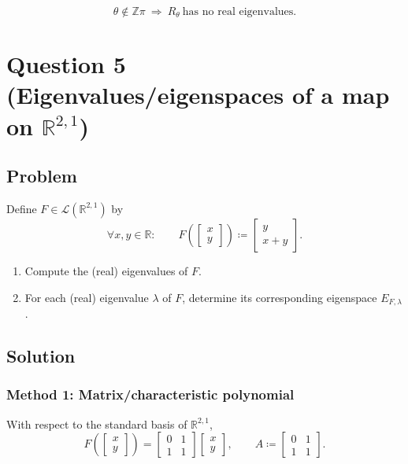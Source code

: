\documentclass[12pt]{article}
\newcommand{\R}{\mathbb{R}}
\newcommand{\cL}{\mathcal{L}}
\begin{document}
\[
\boxed{\,\theta\notin\mathbb{Z}\pi\ \Longrightarrow\ R_{\theta}\ \text{has no real eigenvalues.}\,}
\]

\newpage
\section{Question 5 (Eigenvalues/eigenspaces of a map on $\R^{2,1}$)}
\subsection{Problem}
Define $F\in \cL(\R^{2,1})$ by
\[
\forall x,y\in\R:\qquad
F\!\left(\begin{bmatrix}x\\y\end{bmatrix}\right)
\coloneqq
\begin{bmatrix}
y\\
x+y
\end{bmatrix}.
\]
\begin{enumerate}[label=(\alph*)]
\item Compute the (real) eigenvalues of $F$.
\item For each (real) eigenvalue $\lambda$ of $F$, determine its corresponding eigenspace $E_{F,\lambda}$.
\end{enumerate}

\subsection{Solution}

\subsubsection{Method 1: Matrix/characteristic polynomial}
With respect to the standard basis of $\R^{2,1}$,
\[
F\!\left(\begin{bmatrix}x\\y\end{bmatrix}\right)=
\begin{bmatrix}
0&1\\
1&1
\end{bmatrix}
\begin{bmatrix}x\\y\end{bmatrix},
\qquad
A\coloneqq
\begin{bmatrix}
0&1\\
1&1
\end{bmatrix}.
\]
\end{document}
